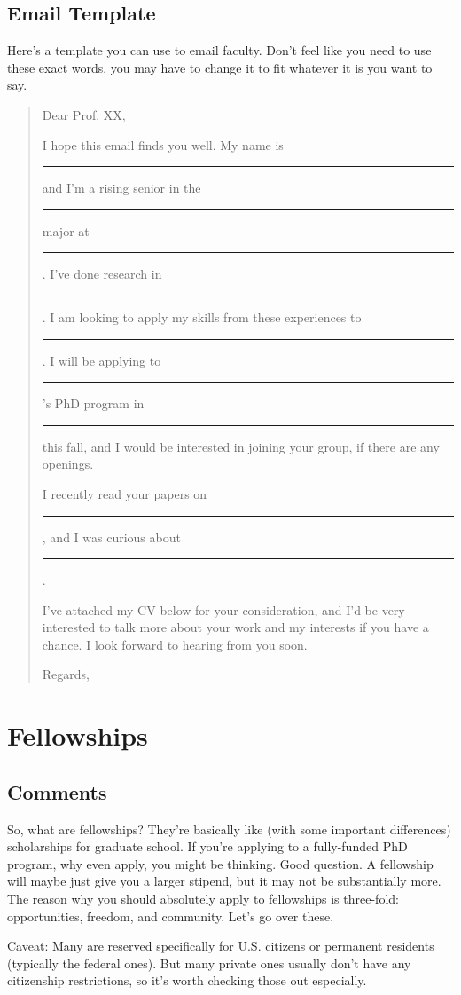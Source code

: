 \documentclass[12pt]{article}
\begin{document}
\subsection{Email Template}

Here's a template you can use to email faculty. Don't feel like you need to use these exact words, you may have to change it to fit whatever it is you want to say.
\begin{quote}
Dear Prof. XX,

I hope this email finds you well. My name is \rule{1cm}{0.15mm} and I'm a rising senior in the \rule{1cm}{0.15mm} major at \rule{1cm}{0.15mm}. I've done research in \rule{1cm}{0.15mm}. I am looking to apply my skills from these experiences to \rule{1cm}{0.15mm}. I will be applying to \rule{1cm}{0.15mm}'s PhD program in \rule{1cm}{0.15mm} this fall, and I would be interested in joining your group, if there are any openings.

I recently read your papers on \rule{1cm}{0.15mm}, and I was curious about \rule{3cm}{0.15mm}.

I've attached my CV below for your consideration, and I'd be very interested to talk more about your work and my interests if you have a chance. I look forward to hearing from you soon.

Regards,

\end{quote}

\section{Fellowships}
\subsection{Comments}
So, what are fellowships? They're basically like  (with some important differences) scholarships for graduate school. If you're applying to a fully-funded PhD program, why even apply, you might be thinking. Good question. A fellowship will maybe just give you a larger stipend, but it may not be substantially more. The reason why you should absolutely apply to fellowships is three-fold: opportunities, freedom, and community. Let's go over these.

Caveat: Many are reserved specifically for U.S. citizens or permanent residents (typically the federal ones). But many private ones usually don't have any citizenship restrictions, so it's worth checking those out especially.
\end{document}
